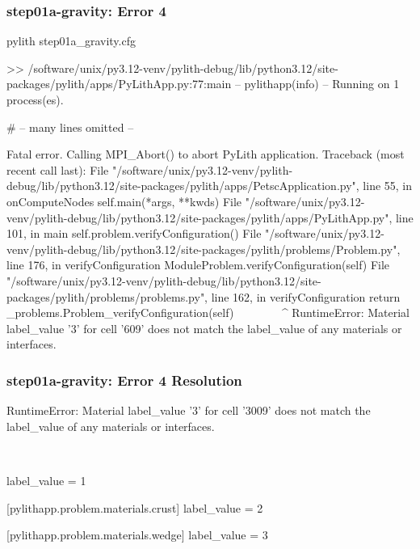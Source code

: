 \documentclass[aspectratio=169]{beamer}
\begin{document}
\begin{frame}[fragile]
  \frametitle{{\ttfamily step01a-gravity}: Error 4}

\begin{bashcode}
pylith step01a_gravity.cfg

 >> /software/unix/py3.12-venv/pylith-debug/lib/python3.12/site-packages/pylith/apps/PyLithApp.py:77:main
 -- pylithapp(info)
 -- Running on 1 process(es).

# -- many lines omitted --

Fatal error. Calling MPI_Abort() to abort PyLith application.
Traceback (most recent call last):
  File "/software/unix/py3.12-venv/pylith-debug/lib/python3.12/site-packages/pylith/apps/PetscApplication.py", line 55, in onComputeNodes
    self.main(*args, **kwds)
  File "/software/unix/py3.12-venv/pylith-debug/lib/python3.12/site-packages/pylith/apps/PyLithApp.py", line 101, in main
    self.problem.verifyConfiguration()
  File "/software/unix/py3.12-venv/pylith-debug/lib/python3.12/site-packages/pylith/problems/Problem.py", line 176, in verifyConfiguration
    ModuleProblem.verifyConfiguration(self)
  File "/software/unix/py3.12-venv/pylith-debug/lib/python3.12/site-packages/pylith/problems/problems.py", line 162, in verifyConfiguration
    return _problems.Problem_verifyConfiguration(self)
           ^^^^^^^^^^^^^^^^^^^^^^^^^^^^^^^^^^^^^^^^^^^
RuntimeError: Material label_value '3' for cell '609' does not match the label_value of any materials or interfaces.
\end{bashcode}

\end{frame}


\begin{frame}[t,fragile]
  \frametitle{{\ttfamily step01a-gravity}: Error 4 Resolution}

  \tserror
  \begin{bashcode}
RuntimeError: Material label_value '3' for cell '3009' does not match the label_value of any materials or interfaces.
  \end{bashcode}

  \pause\\[1pt]

  \begin{cfgcode}
    label_value = 1

    [pylithapp.problem.materials.crust]
    label_value = 2

    [pylithapp.problem.materials.wedge]
    label_value = 3
  \end{cfgcode}

\end{frame}
\end{document}
